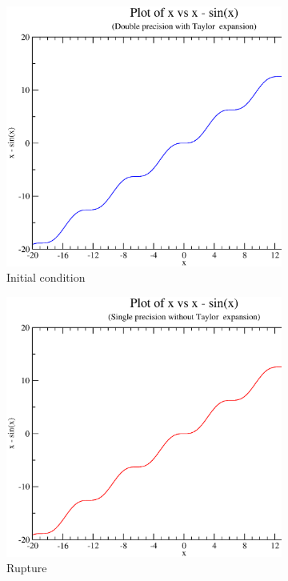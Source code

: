 \documentclass{article}
\begin{document}
\begin{figure}[ht!] 
  \begin{subfigure}[b]{0.5\linewidth}
    \centering
    \includegraphics[width=0.75\linewidth]{images/a.eps} 
    \caption{Initial condition} 
    \label{fig7:a} 
    \vspace{4ex}
  \end{subfigure}%
  \begin{subfigure}[b]{0.5\linewidth}
    \centering
    \includegraphics[width=0.75\linewidth]{images/b.eps} 
    \caption{Rupture} 
    \label{fig7:b} 
    \vspace{4ex}
  \end{subfigure} 
  \begin{subfigure}[b]{0.5\linewidth}

\end{subfigure}
\end{figure}
\end{document}
